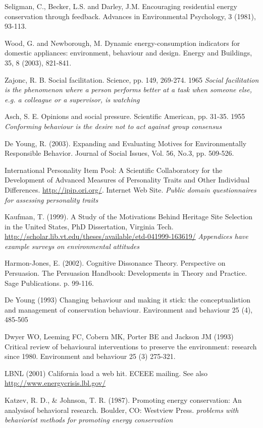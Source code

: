 Seligman, C., Becker, L.S. and Darley, J.M. Encouraging residential energy conservation through feedback. Advances in Environmental Psychology, 3 (1981), 93-113.

Wood, G. and Newborough, M. Dynamic energy-consumption indicators for domestic appliances: environment, behaviour and design. Energy and Buildings, 35, 8 (2003), 821-841.

Zajonc, R. B. Social facilitation. Science, pp. 149, 269-274. 1965 \emph{Social facilitation is the phenomenon where a person performs better at a task when someone else, e.g. a colleague or a supervisor, is watching}

Asch, S. E. Opinions and social pressure. Scientiﬁc American, pp. 31-35. 1955 \emph{Conforming behaviour is the desire not to act against group consensus}

De Young, R. (2003). Expanding and Evaluating Motives for Environmentally Responsible Behavior. Journal of Social Issues, Vol. 56, No.3, pp. 509-526.

International Personality Item Pool: A Scientific Collaboratory for the Development of Advanced Measures of Personality Traits and Other Individual Differences. \url{http://ipip.ori.org/}. Internet Web Site. \emph{Public domain questionnaires for assessing personality traits}

Kaufman, T. (1999). A Study of the Motivations Behind Heritage Site Selection in the United States, PhD Dissertation, Virginia Tech. \url{http://scholar.lib.vt.edu/theses/available/etd-041999-163619/} \emph{Appendices have example surveys on environmental attitudes}

Harmon-Jones, E. (2002). Cognitive Dissonance Theory. Perspective on Persuasion. The Persuasion Handbook:  Developments in Theory and Practice. Sage Publications. p. 99-116.

De Young (1993) Changing behaviour and making it stick: the conceptualistion and management of conservation behaviour. Environment and behaviour 25 (4), 485-505 

Dwyer WO, Leeming FC, Cobern MK, Porter BE and Jackson JM (1993) Critical review of behavioural interventions to preserve the environment: research since 1980. Environment and behaviour 25 (3) 275-321.

LBNL (2001) California load a web hit. ECEEE mailing. See also \url{http://www.energycrisis.lbl.gov/}

Katzev, R. D., \& Johnson, T. R. (1987). Promoting energy conservation: An analysisof behavioral research. Boulder, CO: Westview Press. \emph{problems with behaviorist methods for promoting energy conservation}

